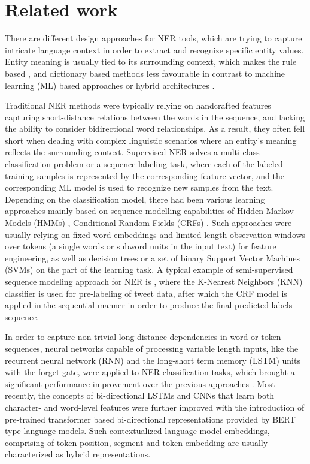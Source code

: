 \section{Related work}
\label{Related work}

There are different design approaches for NER tools, which are trying to capture intricate language context in order to extract and recognize specific entity values. Entity meaning is usually tied to its surrounding context, which makes the rule based \cite{alfred2014malay, chiticariu2013rule}, and dictionary based methods \cite{hanisch2005prominer} less favourable in contrast to machine learning (ML) based approaches \cite{geng2017clinical, lee2020biobert, chalkidis2020legal} or hybrid architectures \cite{petasis2001using, nastou2024improving}.

Traditional NER methods were typically relying on handcrafted features capturing short-distance relations between the words in the sequence, and lacking the ability to consider bidirectional word relationships. As a result, they often fell short when dealing with complex linguistic scenarios where an entity's meaning reflects the surrounding context. Supervised NER solves a multi-class classification problem or a sequence labeling task, where each of the labeled training samples is represented by the corresponding feature vector, and the corresponding ML model is used to recognize new samples from the text. Depending on the classification model, there had been various learning approaches mainly based on sequence modelling capabilities of Hidden Markov Models (HMMs) \cite{bikel1997nymble}, Conditional Random Fields (CRFs) \cite{lafferty2001conditional, mccallumli2003early}.  Such approaches were usually relying on fixed word embeddings and limited length observation windows over tokens (a single words or subword units in the input text) for feature engineering, as well as decision trees \cite{szarvas2006multilingual} or a set of binary Support Vector Machines (SVMs) \cite{mcnamee2002entity} on the part of the learning task. A typical example of semi-supervised sequence modeling approach for NER is \cite{chiu2016named}, where the K-Nearest Neighbors (KNN) classifier is used for pre-labeling of tweet data, after which the CRF model is applied in the sequential manner in order to produce the final predicted labels sequence.

In order to capture non-trivial long-distance dependencies in word or token sequences, neural networks capable of processing variable length inputs, like the recurrent neural network (RNN) and the long-short term memory (LSTM) units with the forget gate, were applied to NER classification tasks, which brought a significant performance improvement over the previous approaches \cite{chiu2016named}. Most recently, the concepts of bi-directional LSTMs and CNNs that learn both character- and word-level features were further improved with the introduction of pre-trained transformer based bi-directional representations provided by BERT type \cite{kenton2019bert} language models. Such contextualized language-model embeddings, comprising of token position, segment and token embedding are usually characterized as hybrid representations.

